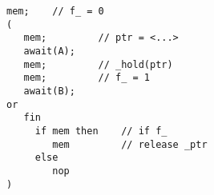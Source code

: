 \begin{lstlisting}
mem;    // f_ = 0
(
   mem;         // ptr = <...>
   await(A);
   mem;         // _hold(ptr)
   mem;         // f_ = 1
   await(B);
or
   fin
     if mem then    // if f_
        mem         // release _ptr
     else
        nop
)
\end{lstlisting}

\begin{comment}

There are also some restriction on valid programs in \CEU, which the semantic 
allows:
- loops
- awaits in fins
- local scopes

handled in separate, in a parsing phase that is not related to the execution


The semantic rules are continuously applied (note the `$*$' klenee operator) 
until
consider only the top of the stack and continuously apply transformations to 
the program until it blocks and no rules can be applied.
The \emph{isBlocked} predicate of Figure~\ref{fig.isBlocked} identifies a 
blocked program based on its structure and event at the top of the stack.
xxx
A program becomes blocked when all parallel branches are hanged in $awaiting$, 
$stacked$, and/or $emitting$ primitives, as defined in 
Figure~\ref{fig:isBlocked}.
an \code{awaiting} is unblocked only if its event matches the top of the stack
the \code{emitting} primitive only proceeds once its stack level is restored.

\begin{itemize}
\item The program is awaiting in all trails, i.e., function $pop$ returns 
$(0,\{\})$.
\item The program terminates, i.e., the small-step rules transform the whole 
program into a $mem(id)$.
\end{itemize}
%
In Section~\ref{XXX} we show that by imposing syntactic restrictions to 
programs, reaction chains always reach one of these conditions in a finite 
number of steps, meaning that reactions to the environment always execute in 
bounded time.

To be compliant with the reactive nature of \CEU, we assume that all programs 
start awaiting the main event ``$\$$'', which is emitted once by the 
environment on startup, i.e., $(i,E)=(1,\{\$\})$ for the very first big step.

As briefly introduced, small-step rules continuously apply transformations to 
unblocked trails.
A program becomes blocked when all parallel branches are hanged in $awaiting$, 
$stacked$, and/or $emitting$ primitives, as defined in 
Figure~\ref{fig:isBlocked}.

All small-step rules are associated with the current (deepest) stack depth 
level $i$ acquired from the previous big step.


\end{comment}
